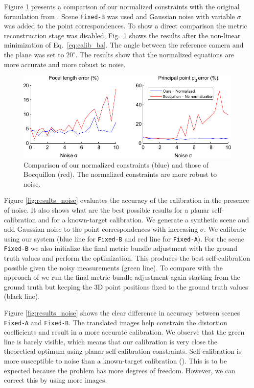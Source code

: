 \documentclass[10pt,twocolumn,letterpaper]{article}
\begin{document}
Figure \ref{fig:results_no_norm} presents a comparison of our normalized constraints with the original formulation from \cite{bocquillon2006}. Scene \texttt{Fixed-B} was used and Gaussian noise with variable $\sigma$ was added  to the point correspondences. To show a direct comparison the metric reconstruction stage was disabled, Fig.~\ref{fig:results_no_norm} shows the results after the non-linear minimization of Eq.~\eqref{eq:calib_ba}. The angle between the reference camera and the plane was set to $20^\circ$. The results show that the normalized equations are more accurate and more robust to noise.

\begin{figure}
\centering
\includegraphics[width=\linewidth]{images/resultsNoNorm.pdf}
\caption{Comparison of our normalized constraints (blue) and those of Bocquillon \cite{bocquillon2006} (red). The normalized constraints are more robust to noise.}
\label{fig:results_no_norm}
\end{figure}

Figure \ref{fig:results_noise} evaluates the accuracy of the calibration in the presence of noise. It also shows what are the best possible results for a planar self-calibration and for a known-target calibration. We generate a synthetic scene and add Gaussian noise to the point correspondences with increasing $\sigma$. We calibrate using our system (blue line for \texttt{Fixed-B} and red line for \texttt{Fixed-A}). For the scene \texttt{Fixed-B} we also initialize the final metric bundle adjustment with the ground truth values and perform the optimization. This produces the best self-calibration possible given the noisy measurements (green line). To compare with the approach of \cite{zhang1999} we run the final metric bundle adjustment again starting from the ground truth but keeping the 3D point positions fixed to the ground truth values (black line). 

Figure \ref{fig:results_noise} shows the clear difference in accuracy between scenes \texttt{Fixed-A} and \texttt{Fixed-B}. The translated images help constrain the distortion coefficients and result in a more accurate calibration. We observe that the green line is barely visible, which means that our calibration is very close the theoretical optimum using planar self-calibration constraints. Self-calibration is more susceptible to noise than a known-target calibration (\eg \cite{zhang1999}). This is to be expected because the problem has more degrees of freedom. However, we can correct this by using more images.
\end{document}
